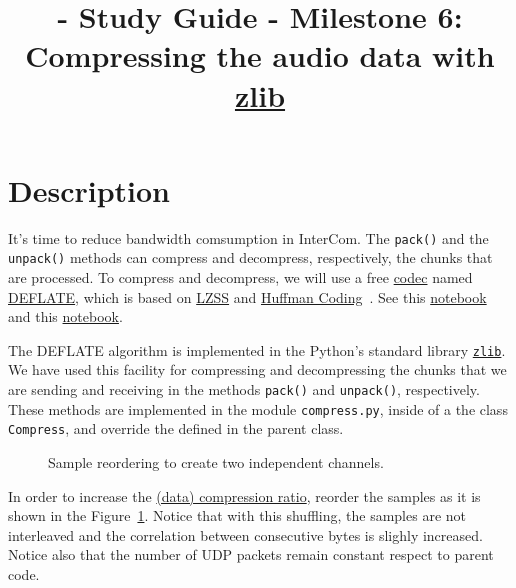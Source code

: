 
\title{\TM{} - Study Guide - Milestone 6: Compressing the audio data with \href{https://zlib.net/}{zlib}}

\maketitle

\section{Description}

It's time to reduce bandwidth comsumption in InterCom. The
\verb|pack()| and the \verb|unpack()| methods can compress and
decompress, respectively, the chunks that are processed. To compress
and decompress, we will use a free
\href{https://en.wikipedia.org/wiki/Codec}{codec} named
\href{https://en.wikipedia.org/wiki/DEFLATE}{DEFLATE}, which is based
on
\href{https://en.wikipedia.org/wiki/Lempel%E2%80%93Ziv%E2%80%93Storer%E2%80%93Szymanski}{LZSS}
  and \href{https://en.wikipedia.org/wiki/Huffman_coding}{Huffman
    Coding}~\cite{nelson96datacompression}. See this
  \href{https://github.com/vicente-gonzalez-ruiz/LZ77}{notebook} and
  this
  \href{https://vicente-gonzalez-ruiz.github.io/Huffman_coding/}{notebook}.

The DEFLATE algorithm is implemented in the Python's standard library
\href{https://docs.python.org/3/library/zlib.html}{\texttt{zlib}}. We
have used this facility for compressing and decompressing the chunks
that we are sending and receiving in the methods \verb|pack()| and
\verb|unpack()|, respectively. These methods are implemented in the
module \verb|compress.py|, inside of a the class \verb|Compress|, and
override the defined in the parent class.

\begin{figure}
  \begin{center}
  \end{center}
  \caption{Sample reordering to create two independent channels.}
  \label{fig:reordering}
\end{figure}

In order to increase the
\href{https://en.wikipedia.org/wiki/Data_compression_ratio}{(data)
  compression ratio}, reorder the samples as it is shown in the
Figure~\ref{fig:reordering}. Notice that with this shuffling, the
samples are not interleaved and the correlation between consecutive
bytes is slighly increased. Notice also that the number of UDP packets
remain constant respect to parent code.

